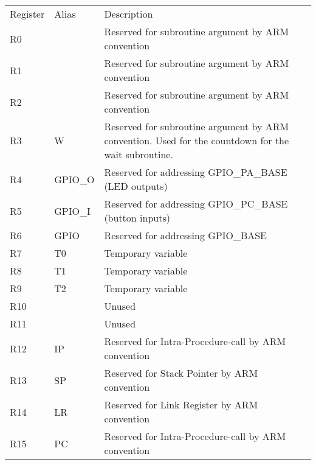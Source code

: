 \begin{table}
    \begin{tabular}{lll}
        Register & Alias   & Description                                            \\
        R0       & ~       & Reserved for subroutine argument by ARM convention     \\
        R1       & ~       & Reserved for subroutine argument by ARM convention     \\
        R2       & ~       & Reserved for subroutine argument by ARM convention     \\
        R3       & W       & Reserved for subroutine argument by ARM convention.
                             Used for the countdown for the wait subroutine.        \\
        R4       & GPIO\_O & Reserved for addressing GPIO\_PA\_BASE (LED outputs)   \\
        R5       & GPIO\_I & Reserved for addressing GPIO\_PC\_BASE (button inputs) \\
        R6       & GPIO    & Reserved for addressing GPIO\_BASE                     \\
        R7       & T0      & Temporary variable                                     \\
        R8       & T1      & Temporary variable                                     \\
        R9       & T2      & Temporary variable                                     \\
        R10      & ~       & Unused                                                 \\
        R11      & ~       & Unused                                                 \\
        R12      & IP      & Reserved for Intra-Procedure-call by ARM convention    \\
        R13      & SP      & Reserved for Stack Pointer by ARM convention           \\
        R14      & LR      & Reserved for Link Register  by ARM convention          \\
        R15      & PC      & Reserved for Intra-Procedure-call by ARM convention    \\
    \end{tabular}
\end{table}
